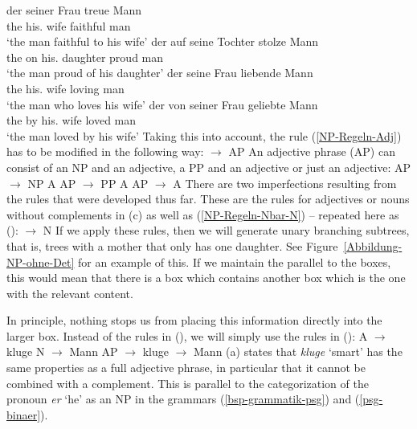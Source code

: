 \eal
\ex 
\gll der seiner Frau treue Mann\\
	 the his.\dat{} wife faithful man\\
\glt `the man faithful to his wife'
\ex 
\gll der auf seine Tochter stolze Mann\\
     the on his.\acc{} daughter proud man\\
\glt `the man proud of his daughter'
\ex 
\gll der seine Frau liebende Mann\\
     the his.\acc{} wife loving man\\
\glt `the man who loves his wife'
\ex 
\gll der von seiner Frau geliebte Mann\\
     the by his.\dat{} wife loved man\\
\glt `the man loved by his wife'	 
\zl
Taking this into account, the rule (\ref{NP-Regeln-Adj}) has to be modified in the following way:
\ea
\label{NP-Regeln-AP} 
\nbar $\to$ AP \nbar
\z
An adjective phrase (AP) can consist of an NP and an adjective, a PP and an adjective or just an adjective:
\eal
\ex AP $\to$ NP A
\ex AP $\to$ PP A
\ex AP $\to$ A
\zl
\addlines
There are two imperfections resulting from the rules that were developed thus far. These are the rules for adjectives
or nouns without complements in (c) as well as (\ref{NP-Regeln-Nbar-N}) -- repeated here as ():
\ea
\nbar $\to$ N
\z
If we apply these rules, then we will generate unary branching subtrees, that is, trees with a mother that
only has one daughter. See Figure~\ref{Abbildung-NP-ohne-Det} for an example of this. If we maintain the
parallel to the boxes, this would mean that there is a box which contains another box which is the one with 
the relevant content.

In principle, nothing stops us from placing this information directly into the larger box. Instead of
the rules in (), we will simply use the rules in ():
\eal
\ex A $\to$ kluge
\ex N $\to$ Mann
\zl
\eal
\label{Lexikon-Projektion}
\ex AP $\to$ kluge
\ex \nbar $\to$ Mann
\zl
(a) states that \emph{kluge}  `smart' has the same properties as a full adjective phrase, in particular that it cannot be combined
with a complement. This is parallel to the categorization of the pronoun \emph{er} `he' as an NP in the grammars
(\ref{bsp-grammatik-psg}) and (\ref{psg-binaer}).

